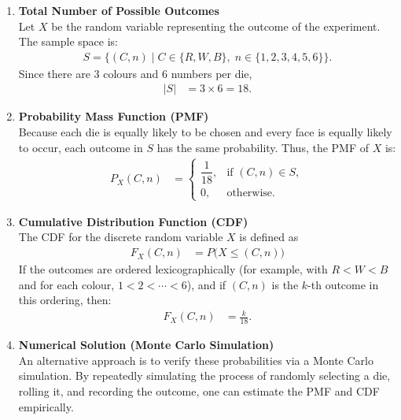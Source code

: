 \documentclass[journal,12pt,onecolumn]{IEEEtran}
\theoremstyle{remark}
\begin{document}
\solution 
\begin{enumerate}
  \item \textbf{Total Number of Possible Outcomes}\\
  Let $X$ be the random variable representing the outcome of the experiment. The sample space is:
  \begin{align}
   S = \{ (C, n) \mid C \in \{R, W, B\},\; n \in \{1, 2, 3, 4, 5, 6\} \}.
  \end{align}
  Since there are 3 colours and 6 numbers per die,
  \begin{align}
    |S| &= 3 \times 6 = 18.
  \end{align}
  
  \item \textbf{Probability Mass Function (PMF)}\\
  Because each die is equally likely to be chosen and every face is equally likely to occur, each outcome in $S$ has the same probability. Thus, the PMF of $X$ is:
  \begin{align}
    P_X(C, n) &= 
    \begin{cases}
      \dfrac{1}{18}, & \text{if } (C, n) \in S, \\
      0, & \text{otherwise.}
    \end{cases}
  \end{align}
  
  \item \textbf{Cumulative Distribution Function (CDF)}\\
  The CDF for the discrete random variable $X$ is defined as
  \begin{align}
    F_X(C, n) &= P\bigl(X \le (C, n)\bigr) \nonumber 
  \end{align}
  If the outcomes are ordered lexicographically (for example, with $R < W < B$ and for each colour, $1 < 2 < \cdots < 6$), and if $(C, n)$ is the $k$-th outcome in this ordering, then:
  \begin{align}
    F_X(C, n) &= \frac{k}{18}.
  \end{align}
  
  \item \textbf{Numerical Solution (Monte Carlo Simulation)}\\
  An alternative approach is to verify these probabilities via a Monte Carlo simulation. By repeatedly simulating the process of randomly selecting a die, rolling it, and recording the outcome, one can estimate the PMF and CDF empirically.
  
\end{enumerate}
\end{document}
